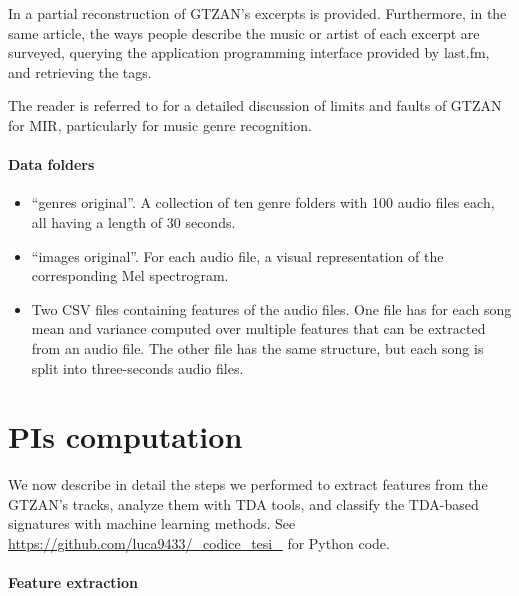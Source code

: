 \documentclass[english, LaM, oneside, noexaminfo]{sapthesis}
\begin{document}
In \cite{sturm2013gtzan} a partial reconstruction of GTZAN's excerpts is provided. Furthermore, in the same article, the ways people describe the music or artist of each excerpt are surveyed, querying the application programming interface provided by last.fm, and retrieving the tags. 

The reader is referred to \cite{sturm2013gtzan} for a detailed discussion of limits and faults of GTZAN for MIR, particularly for music genre recognition.

\paragraph{Data folders}
\begin{itemize}
    \item ``genres original''. A collection of ten genre folders with 100 audio files each, all having a length of 30 seconds.
    \item ``images original''. For each audio file, a visual representation of the corresponding Mel spectrogram.
    \item Two CSV files containing features of the audio files. One file has for each song mean and variance computed over multiple features that can be extracted from an audio file. The other file has the same structure, but each song is split into three-seconds audio files.
\end{itemize}

\section{PIs computation}

We now describe in detail the steps we performed to extract features from the GTZAN’s tracks, analyze them with TDA tools, and classify the TDA-based signatures with machine learning methods. See \href{https://github.com/luca9433/_codice_tesi_}{https://github.com/luca9433/_codice_tesi_} for Python code.

\paragraph{Feature extraction}
\end{document}
